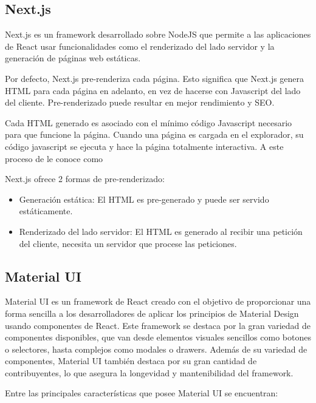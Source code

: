 \subsection{Next.js}

Next.js es un framework desarrollado sobre NodeJS que permite a las aplicaciones de React usar funcionalidades como el renderizado del lado servidor y la generación de páginas web estáticas.

Por defecto, Next.js pre-renderiza cada página. Esto significa que Next.js genera HTML para cada página en adelanto, en vez de hacerse con Javascript del lado del cliente. Pre-renderizado puede resultar en mejor rendimiento y SEO.

Cada HTML generado es asociado con el mínimo código Javascript necesario para que funcione la página. Cuando una página es cargada en el explorador, su código javascript se ejecuta y hace la página totalmente interactiva. A este proceso de le conoce como 

Next.js ofrece 2 formas de pre-renderizado:

\begin{itemize}
  \item Generación estática: El HTML es pre-generado y puede ser servido estáticamente.
  \item Renderizado del lado servidor: El HTML es generado al recibir una petición del cliente, necesita un servidor que procese las peticiones.
\end{itemize}

\subsection{Material UI}

Material UI es un framework de React creado con el objetivo de proporcionar una forma sencilla a los desarrolladores de aplicar los principios de Material Design \cite{MaterialDesignPrinciples} usando componentes de React. Este framework se destaca por la gran variedad de componentes disponibles, que van desde elementos visuales sencillos como botones o selectores, hasta complejos como modales o drawers. Además de su variedad de componentes, Material UI también destaca por su gran cantidad de contribuyentes, lo que asegura la longevidad y mantenibilidad del framework.

Entre las principales características que posee Material UI se encuentran:

